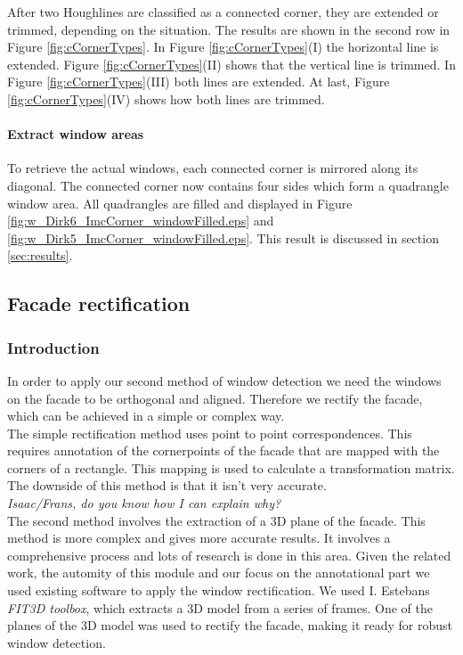 After two Houghlines are classified as a connected corner, they are extended or
trimmed, depending on the situation. The results are shown in the second row in
Figure \ref{fig:cCornerTypes}.
In Figure \ref{fig:cCornerTypes}(I)  the horizontal line is extended.  Figure
\ref{fig:cCornerTypes}(II) shows that the vertical line is trimmed.  In Figure
\ref{fig:cCornerTypes}(III) both lines are extended.  At last, Figure
\ref{fig:cCornerTypes}(IV) shows how both lines are trimmed.


\paragraph{Extract window areas}
To retrieve the actual windows, each connected corner is mirrored along its
diagonal. The connected corner now contains four sides which form a 
quadrangle window area.
All quadrangles are filled and displayed in Figure
\ref{fig:w_Dirk6_ImcCorner_windowFilled.eps} and
\ref{fig:w_Dirk5_ImcCorner_windowFilled.eps}. This result is discussed in section
\ref{sec:results}.










\subsection{Facade rectification}
\subsubsection{Introduction}
In order to apply our second method of window detection
we need the windows on the facade to be orthogonal and aligned.
Therefore we rectify the facade, which can be achieved in a simple or complex way.\\

The simple rectification method uses point to point correspondences. This 
requires annotation of the cornerpoints of the facade that are mapped with the
corners of a rectangle. This mapping is used to calculate a transformation matrix. 
 The downside of this method is that it isn't very accurate.\\
\emph{Isaac/Frans, do you know how I can explain why?}\\

The second method involves the extraction of a 3D plane of the facade. This 
method is more complex and gives more accurate results. It involves a
comprehensive process and lots of research is done in this area. 
Given the related work, the automity of this module and our focus on the annotational part
we used existing software to apply the window rectification.
We used I. Estebans \emph{FIT3D toolbox}, which extracts a 3D model from a
series of frames.  One of the planes of the 3D model was used to rectify the
facade, making it ready for robust window detection. 

